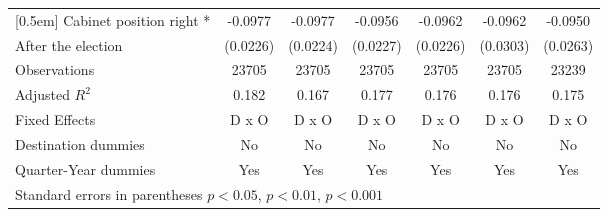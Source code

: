 \begin{table}[htbp]
\begin{tabular}{l*{6}{c}}
[0.5em]
Cabinet position right * &     -0.0977\sym{***}&     -0.0977\sym{***}&     -0.0956\sym{***}&     -0.0962\sym{***}&     -0.0962\sym{**} &     -0.0950\sym{***}\\
After the election                    &    (0.0226)         &    (0.0224)         &    (0.0227)         &    (0.0226)         &    (0.0303)         &    (0.0263)         \\
\hline
Observations        &       23705         &       23705         &       23705         &       23705         &       23705         &       23239         \\
Adjusted \(R^{2}\)  &       0.182         &       0.167         &       0.177         &       0.176         &       0.176         &       0.175         \\
Fixed Effects       &       D x O         &       D x O         &       D x O         &       D x O         &       D x O         &       D x O         \\
Destination dummies &          No         &          No         &          No         &          No         &          No         &          No         \\
Quarter-Year dummies&         Yes         &         Yes         &         Yes         &         Yes         &         Yes         &         Yes         \\
\hline\hline
\multicolumn{7}{l}{Standard errors in parentheses \sym{*} \(p<0.05\), \sym{**} \(p<0.01\), \sym{***} \(p<0.001\)}\\
\end{tabular}
\end{table}
